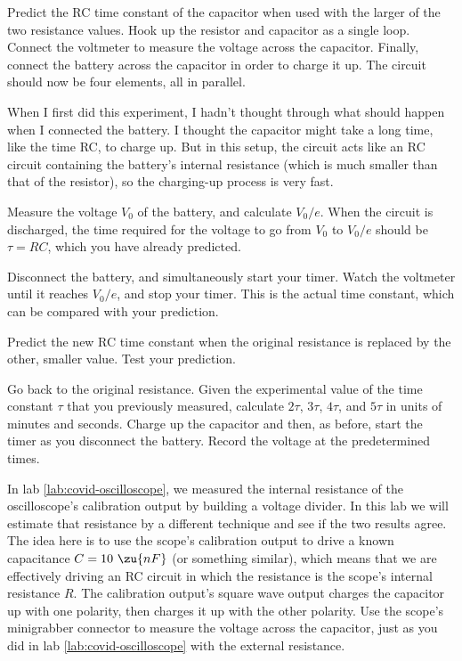 \observations


Predict the RC time constant of the capacitor when used with
the larger of the two resistance values. Hook up the resistor
and capacitor as a single loop. Connect the voltmeter to measure
the voltage across the capacitor. Finally, connect the battery
across the capacitor in order to charge it up. The circuit should
now be four elements, all in parallel.

When I first did this experiment, I hadn't thought through what
should happen when I connected the battery. I thought the capacitor
might take a long time, like the time RC, to charge up. But in this
setup, the circuit acts like an RC circuit containing the battery's
internal resistance (which is much smaller than that of the resistor),
so the charging-up process is very fast.

Measure the voltage $V_0$ of the battery, and calculate $V_0/e$. When
the circuit is discharged, the time required for the voltage to go from
$V_0$ to $V_0/e$ should be $\tau=RC$, which you have already predicted.

Disconnect the battery, and simultaneously start your timer.
Watch the voltmeter until it reaches $V_0/e$, and stop your timer.
This is the actual time constant, which can be compared with your
prediction.


Predict the new RC time constant when the original resistance is
replaced by the other, smaller value. Test your prediction.


Go back to the original resistance. Given the experimental value of
the time constant $\tau$ that you previously measured, calculate
$2\tau$, $3\tau$, $4\tau$, and $5\tau$ in units of minutes and seconds.
Charge up the capacitor and then, as before, start the timer as you
disconnect the battery. Record the voltage at the predetermined times.


In lab \ref{lab:covid-oscilloscope}, we measured the internal resistance of
the oscilloscope's calibration output by building a voltage divider. In this
lab we will estimate that resistance by a different technique and see if the
two results agree. The idea here is to use the scope's calibration output to
drive a known capacitance $C=10\ \zu{nF}$ (or something similar), which means that
we are effectively driving an RC circuit in which the resistance is the scope's
internal resistance $R$. The calibration output's square wave output charges
the capacitor up with one polarity, then charges it up with the other polarity.
Use the scope's minigrabber connector to measure the
voltage across the capacitor, just as you did in lab \ref{lab:covid-oscilloscope}
with the external resistance.

